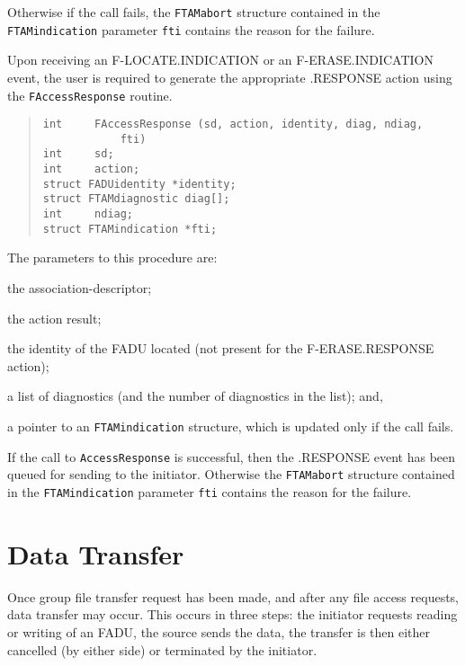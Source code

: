 Otherwise if the call fails,
the \verb"FTAMabort" structure contained in the
\verb"FTAMindication" parameter \verb"fti" contains the reason for the failure.

Upon receiving an {\sf F-LOCATE.INDICATION\/}
or an {\sf F-ERASE.IN\-DI\-CA\-TION\/}
event,
the user is required to generate the appropriate {\sf .RESPONSE\/} action
using the \verb"FAccessResponse" routine.
\begin{quote}\small\begin{verbatim}
int     FAccessResponse (sd, action, identity, diag, ndiag,
            fti)
int     sd;
int     action;
struct FADUidentity *identity;
struct FTAMdiagnostic diag[];
int     ndiag;
struct FTAMindication *fti;
\end{verbatim}\end{quote}
The parameters to this procedure are:
\begin{describe}
\item[\verb"sd":] the association-descriptor;

\item[\verb"action":] the action result;

\item[\verb"identity":] the identity of the FADU located
(not present for the {\sf F-ERASE.RESPONSE\/} action);

\item[\verb"diag"/\verb"ndiag":] a list of diagnostics
(and the number of diagnostics in the list);
and,

\item[\verb"fti":] a pointer to an \verb"FTAMindication" structure, which is
updated only if the call fails.
\end{describe}
If the call to \verb"AccessResponse" is successful,
then the {\sf .RESPONSE\/} event has been queued for sending to the
initiator.
Otherwise the \verb"FTAMabort" structure contained in the
\verb"FTAMindication" parameter \verb"fti" contains the reason for the failure.

\section	{Data Transfer}
Once group file transfer request has been made,
and after any file access requests,
data transfer may occur.
This occurs in three steps:
the initiator requests reading or writing of an FADU,
the source sends the data,
the transfer is then either cancelled (by either side) or terminated by the
initiator.


